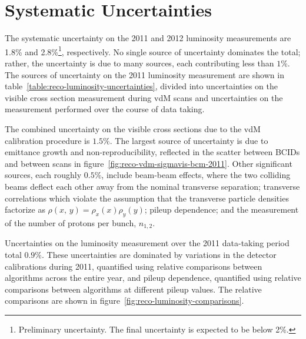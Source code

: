 \section{Systematic Uncertainties}\label{sec:reco-luminosity-uncertainties}
The systematic uncertainty on the 2011 and 2012 luminosity measurements are 1.8\% and 2.8\%\footnote{Preliminary uncertainty. The final uncertainty is expected to be below 2\%.}, respectively. No single source of uncertainty dominates the total; rather, the uncertainty is due to many sources, each contributing less than $1\%$. The sources of uncertainty on the 2011 luminosity measurement are shown in table~\ref{table:reco-luminosity-uncertainties}, divided into uncertainties on the visible cross section measurement during vdM scans and uncertainties on the measurement performed over the course of data taking. 

The combined uncertainty on the visible cross sections due to the vdM calibration procedure is $1.5\%$. The largest source of uncertainty is due to emittance growth and non-reproducibility, reflected in the scatter between BCIDs and between scans in figure~\ref{fig:reco-vdm-sigmavis-bcm-2011}. Other significant sources, each roughly $0.5\%$, include beam-beam effects, where the two colliding beams deflect each other away from the nominal transverse separation; transverse correlations which violate the assumption that the transverse particle densities factorize as $\rho(x,\,y)=\rho_x(x)\rho_y(y)$; pileup dependence; and the measurement of the number of protons per bunch, $n_{1,2}$. 

Uncertainties on the luminosity measurement over the 2011 data-taking period total $0.9\%$. These uncertainties are dominated by variations in the detector calibrations during 2011, quantified using relative comparisons between algorithms across the entire year, and pileup dependence, quantified using relative comparisons between algorithms at different pileup values. The relative comparisons are shown in figure~\ref{fig:reco-luminosity-comparisons}.

